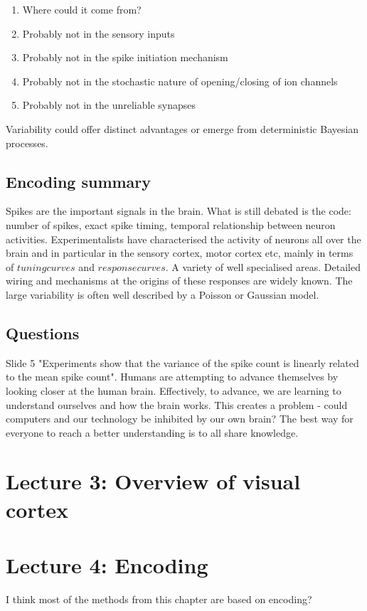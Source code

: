\documentclass[11pt]{article}
\begin{document}
\begin{enumerate}
\item Where could it come from?
\item Probably not in the sensory inputs
\item Probably not in the spike initiation mechanism
\item Probably not in the stochastic nature of opening/closing of ion channels
\item Probably not in the unreliable synapses
\end{enumerate} 

Variability could offer distinct advantages or emerge from deterministic Bayesian processes. 

\subsection{Encoding summary}
Spikes are the important signals in the brain. What is still debated is the code: number of spikes, exact spike timing, temporal relationship between neuron activities. 
Experimentalists have characterised the activity of neurons all over the brain and in particular in the sensory cortex, motor cortex etc, mainly in terms of $tuning curves$ and $response curves$. A variety of well specialised areas. Detailed wiring and mechanisms at the origins of these responses are widely known. 
The large variability is often well described by a Poisson or Gaussian model. 

\subsection{Questions}
Slide 5 "Experiments show that the variance of the spike count is linearly related to the mean spike count".
Humans are attempting to advance themselves by looking closer at the human brain. Effectively, to advance, we are learning to understand ourselves and how the brain works. This creates a problem - could computers and our technology be inhibited by our own brain? The best way for everyone to reach a better understanding is to all share knowledge. 

\section{Lecture 3: Overview of visual cortex}

\section{Lecture 4: Encoding}
I think most of the methods from this chapter are based on encoding?
\end{document}
